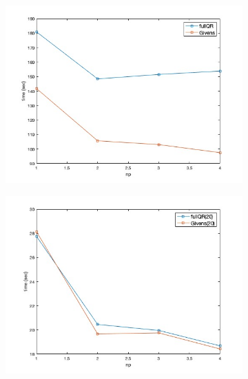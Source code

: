 \documentclass[hidelinks]{article}
\begin{document}
\begin{figure}[H]
    \begin{subfigure}{0.32\textwidth}
        \includegraphics[width=\textwidth]{pic/timeGMRES.jpg}
    \end{subfigure} \hfill
    \begin{subfigure}{0.32\textwidth}
        \includegraphics[width=\textwidth]{pic/timeGMRES20.jpg}
    \end{subfigure} 
    \hfill
    \begin{subfigure}{0.32\textwidth}

\end{subfigure}
\end{figure}
\end{document}
